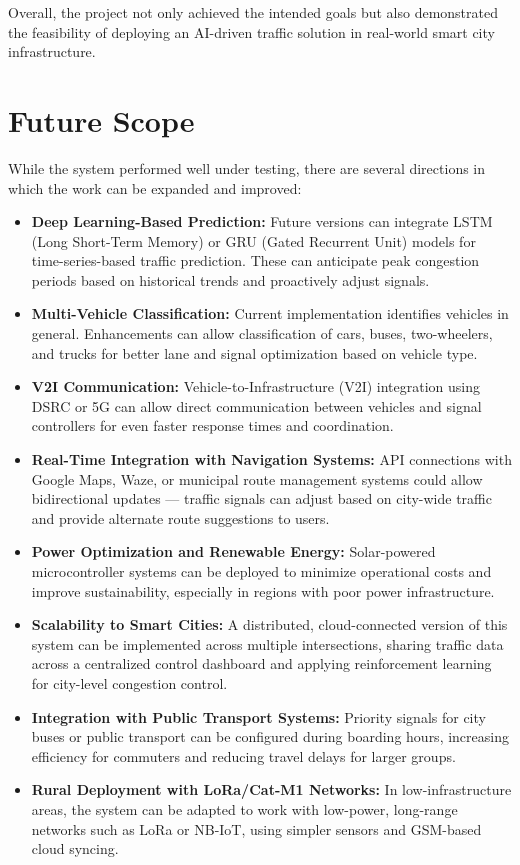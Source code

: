 Overall, the project not only achieved the intended goals but also demonstrated the feasibility of deploying an AI-driven traffic solution in real-world smart city infrastructure.

\section{Future Scope}

While the system performed well under testing, there are several directions in which the work can be expanded and improved:

\begin{itemize}
    \item \textbf{Deep Learning-Based Prediction:} Future versions can integrate LSTM (Long Short-Term Memory) or GRU (Gated Recurrent Unit) models for time-series-based traffic prediction. These can anticipate peak congestion periods based on historical trends and proactively adjust signals.

    \item \textbf{Multi-Vehicle Classification:} Current implementation identifies vehicles in general. Enhancements can allow classification of cars, buses, two-wheelers, and trucks for better lane and signal optimization based on vehicle type.

    \item \textbf{V2I Communication:} Vehicle-to-Infrastructure (V2I) integration using DSRC or 5G can allow direct communication between vehicles and signal controllers for even faster response times and coordination.

    \item \textbf{Real-Time Integration with Navigation Systems:} API connections with Google Maps, Waze, or municipal route management systems could allow bidirectional updates — traffic signals can adjust based on city-wide traffic and provide alternate route suggestions to users.

    \item \textbf{Power Optimization and Renewable Energy:} Solar-powered microcontroller systems can be deployed to minimize operational costs and improve sustainability, especially in regions with poor power infrastructure.

    \item \textbf{Scalability to Smart Cities:} A distributed, cloud-connected version of this system can be implemented across multiple intersections, sharing traffic data across a centralized control dashboard and applying reinforcement learning for city-level congestion control.

    \item \textbf{Integration with Public Transport Systems:} Priority signals for city buses or public transport can be configured during boarding hours, increasing efficiency for commuters and reducing travel delays for larger groups.

    \item \textbf{Rural Deployment with LoRa/Cat-M1 Networks:} In low-infrastructure areas, the system can be adapted to work with low-power, long-range networks such as LoRa or NB-IoT, using simpler sensors and GSM-based cloud syncing.
\end{itemize}

